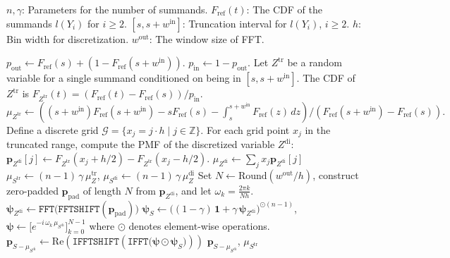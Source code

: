 \documentclass{article}
\theoremstyle{plain}
\theoremstyle{definition}
\begin{document}
\begin{algorithm}
\caption{\textsc{CalculatePMF}}
\label{alg:main_term_random_m}
\begin{algorithmic}[1]
\Require
\State $n, \gamma$: Parameters for the number of summands.
\State $F_{\mathrm{ref}}(t)$: The CDF of the summands $l(Y_i)$ for $i \geq 2$.
\State $[s, s+w^\mathrm{in}]$: Truncation interval for $l(Y_i)$, $i \geq 2$.
\State $h$: Bin width for discretization.
\State $w^\mathrm{out}$: The window size of FFT.


\State {}
\State $p_{\mathrm{out}} \gets F_{\mathrm{ref}}(s) + (1 - F_{\mathrm{ref}}(s+w^\mathrm{in}))$.
\State $p_{\mathrm{in}} \gets 1 - p_{\mathrm{out}}$.
\State Let $Z^{\mathrm{tr}}$ be a random variable for a single summand conditioned on being in $[s, s+w^\mathrm{in}]$.
\State The CDF of $Z^{\mathrm{tr}}$ is $F_{Z^{\mathrm{tr}}}(t) = \left(F_{\mathrm{ref}}(t) - F_{\mathrm{ref}}(s)\right)/p_{\mathrm{in}}$.
\State $\mu_{Z^\mathrm{tr}} \gets \left(
       (s+w^{\mathrm{in}})F_{\mathrm{ref}}(s+w^{\mathrm{in}})
       - sF_{\mathrm{ref}}(s)
       - \displaystyle\int_{s}^{s+w^{\mathrm{in}}} F_{\mathrm{ref}}(z)\,dz\right) / \left(F_{\mathrm{ref}}(s+w^{\mathrm{in}}) - F_{\mathrm{ref}}(s)\right).$
\State Define a discrete grid $\mathcal{G} = \{x_j = j \cdot h \mid j \in \mathbb{Z}\}$.
\State For each grid point $x_j$ in the truncated range, compute the PMF of the discretized variable $Z^{\mathrm{di}}$: $\mathbf{p}_{Z^{\mathrm{di}}}[j] \gets F_{Z^{\mathrm{tr}}}(x_j + h/2) - F_{Z^{\mathrm{tr}}}(x_j - h/2)$.
\State $\mu_{Z^\mathrm{di}} \gets \sum_j x_j  \mathbf{p}_{Z^\mathrm{di}}[j]$
\State {}
\State $\mu_{S^{\mathrm{tr}}} \gets (n-1)\,\gamma\,\mu_{Z}^{\mathrm{tr}}$, $\mu_{S^{\mathrm{di}}} \gets (n-1)\,\gamma\,\mu_{Z}^{\mathrm{di}}$
\State Set $N \gets \mathrm{Round}(w^\mathrm{out}/h)$, construct zero-padded $\mathbf{p}_{\mathrm{pad}}$ of length $N$ from $\mathbf{p}_{Z^{\mathrm{di}}}$, and let $\omega_k = \frac{2\pi k}{N h}$.
\State $\mathbf{\psi}_{Z^{\mathrm{di}}} \gets \texttt{FFT}\bigl(\texttt{FFTSHIFT}(\mathbf{p}_{\mathrm{pad}})\bigr)$
\State $\mathbf{\psi}_S \gets \big((1-\gamma)\,\mathbf{1} + \gamma\,\mathbf{\psi}_{Z^{\mathrm{di}}}\big)^{\odot (n-1)}$,  $\mathbf{\psi} \gets \big[e^{-i\,\omega_k\,\mu_{S^\mathrm{di}}}\big]_{k=0}^{N-1}$ where $\odot$ denotes element-wise operations.
\State $\mathbf{p}_{S-\mu_{S^\mathrm{di}}} \gets  \mathrm{Re}\left(\texttt{IFFTSHIFT}\left(\texttt{IFFT}\big(\mathbf{\psi}\odot\mathbf{\psi}_S\big)\right)\right)$ 
\State \Return $\mathbf{p}_{S-\mu_{S^\mathrm{di}}}$, $\mu_{S^{\mathrm{tr}}}$




\end{algorithmic}
\end{algorithm}
\end{document}
